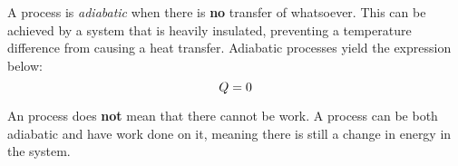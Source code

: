 \begin{definition}[Adiabatic]\label{def:Adiabatic}
  A process is \emph{adiabatic} when there is \textbf{no} transfer of  whatsoever.
  This can be achieved by a system that is heavily insulated, preventing a temperature difference from causing a heat transfer.
  Adiabatic processes yield the expression below:
  \begin{equation}\label{eq:Adiabatic}
    Q = 0
  \end{equation}

  \begin{remark}
    An  process does \textbf{not} mean that there cannot be work.
    A process can be both adiabatic and have work done on it, meaning there is still a change in energy in the system.
  \end{remark}
\end{definition}

